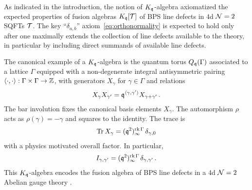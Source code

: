 \documentclass[12pt]{amsart}
\begin{document}
\begin{remark} \label{rem:maximal} As indicated in the introduction, the notion of $K_{\mathfrak{q}}$-algebra axiomatized the
expected properties of fusion algebras $K_{\mathfrak{q}}[{\mathcal T}]$ of BPS line defects in 4d
${\cal N}=2$ SQFTs ${\mathcal T}$. The key ``$\delta_{a,b}$'' axiom~\eqref{eq:orthonormality} is expected to hold
only after one maximally extends the collection of line defects available to the
theory, in particular by including direct summands of available line defects.
\end{remark}

\begin{example}
\label{ex:qt}
The canonical example of a $K_{\mathfrak{q}}$-algebra is the quantum torus $Q_{\mathfrak{q}}(\Gamma)$
associated to a lattice $\Gamma$ equipped with a non-degenerate integral
antisymmetric pairing $\langle \cdot, \cdot \rangle : \Gamma \times \Gamma \to
\mathbb{Z}$, with generators $X_\gamma$ for $\gamma \in \Gamma$ and relations
\begin{equation}
  X_\gamma X_{\gamma'} = \mathfrak{q}^{\langle \gamma, \gamma' \rangle} X_{\gamma + \gamma'}\,.
\end{equation}
The bar involution fixes the canonical basis elements $X_\gamma$. The
automorphism $\rho$ acts as $\rho(\gamma) = - \gamma$ and squares to the
identity. The trace is
\begin{equation}
  \operatorname{Tr} X_\gamma = (\mathfrak{q}^2)_\infty^{\operatorname{rk} \Gamma}\, \delta_{\gamma,0}
\end{equation}
with a physics motivated overall factor. In particular,
\begin{equation}
  I_{\gamma, \gamma'} = (\mathfrak{q}^2)_\infty^{\operatorname{rk} \Gamma}\, \delta_{\gamma, \gamma'}\,.
\end{equation}
This $K_{\mathfrak{q}}$-algebra encodes the fusion algebra of BPS line defects in a 4d ${\cal N}=2$ Abelian gauge theory \cite{Gaiotto:2010be}. 
\end{example}
\end{document}
